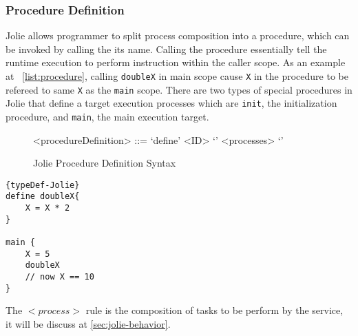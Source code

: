 \subsubsection{Procedure Definition}

Jolie allows programmer to split process composition into a procedure, which can be invoked by calling the its name. Calling the procedure essentially tell the runtime execution to perform instruction within the caller scope. As an example at ~\ref{list:procedure}, calling \texttt{doubleX} in main scope cause \texttt{X} in the procedure to be refereed to same \texttt{X} as the \texttt{main} scope. There are two types of special procedures in Jolie that define a target execution processes which are \texttt{init}, the initialization procedure, and \texttt{main}, the main execution target.

\begin{figure}[h]
	\begin{framed}
		\begin{grammar}
			<procedureDefinition> ::= `define' <ID> `{' <processes> `}'
		\end{grammar}
	\end{framed}
	\caption{Jolie Procedure Definition Syntax}
\end{figure}


\begin{listing}[h]
\lstset{language=Jolie,
	style=codeStyle
}
\begin{lstlisting}[frame=tlrb]{typeDef-Jolie}
define doubleX{
	X = X * 2
}

main {
	X = 5
	doubleX
	// now X == 10
}
\end{lstlisting}
\caption{Jolie procedure example}
\label{list:procedure}
\end{listing}

The \(<process>\) rule is the composition of tasks to be perform by the service, it will be discuss at \autoref{sec:jolie-behavior}.

\FloatBarrier

